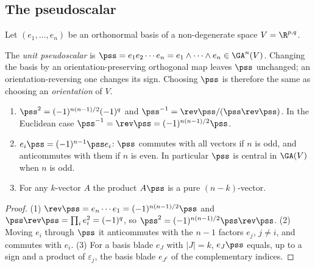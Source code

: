 \subsection{The pseudoscalar}

Let $(e_1,\dots,e_n)$ be an orthonormal basis of a non-degenerate space $V=\R^{p,q}$.

\begin{definition}[Pseudoscalar]
The \emph{unit pseudoscalar} is $\pss=e_1e_2\cdots e_n=e_1\wedge\cdots\wedge e_n\in\GA^n(V)$. Changing the basis by an orientation-preserving orthogonal map leaves $\pss$ unchanged; an orientation-reversing one changes its sign. Choosing $\pss$ is therefore the same as choosing an \emph{orientation} of $V$.
\end{definition}

\begin{proposition}\label{prop:pss}
\begin{enumerate}
  \item $\pss^2=(-1)^{n(n-1)/2}(-1)^q$ and $\pss^{-1}=\rev\pss/(\pss\rev\pss)$. In the Euclidean case $\pss^{-1}=\rev\pss=(-1)^{n(n-1)/2}\pss$.
  \item $e_i\pss=(-1)^{n-1}\pss e_i$: $\pss$ commutes with all vectors if $n$ is odd, and anticommutes with them if $n$ is even. In particular $\pss$ is central in $\GA(V)$ when $n$ is odd.
  \item For any $k$-vector $A$ the product $A\pss$ is a pure $(n-k)$-vector.
\end{enumerate}
\end{proposition}
\begin{proof}
(1) $\rev\pss=e_n\cdots e_1=(-1)^{n(n-1)/2}\pss$ and $\pss\rev\pss=\prod_i e_i^2=(-1)^q$, so $\pss^2=(-1)^{n(n-1)/2}\pss\rev\pss$. (2) Moving $e_i$ through $\pss$ it anticommutes with the $n-1$ factors $e_j$, $j\neq i$, and commutes with $e_i$. (3) For a basis blade $e_J$ with $|J|=k$, $e_J\pss$ equals, up to a sign and a product of $\varepsilon_j$, the basis blade $e_{J^c}$ of the complementary indices.
\end{proof}
